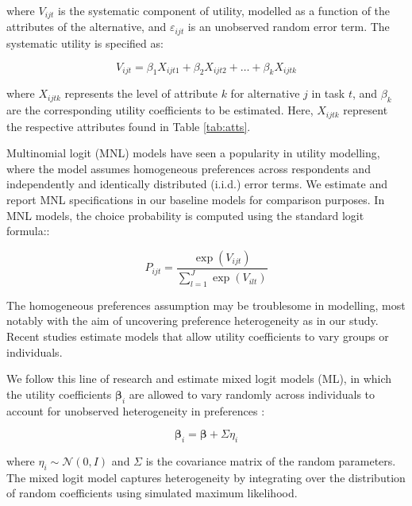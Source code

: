 \documentclass[3p,11pt ]{elsarticle}
\begin{document}
\noindent where \( V_{ijt} \) is the systematic component of utility, modelled as a function of the attributes of the alternative, and \( \varepsilon_{ijt} \) is an unobserved random error term.
The systematic utility is specified as:

\begin{equation}
V_{ijt} = \beta_1 X_{ijt1} + \beta_2 X_{ijt2} + \ldots + \beta_k X_{ijtk}
\end{equation}

\noindent where \( X_{ijtk} \) represents the level of attribute \( k \) for alternative \( j \) in task \( t \), and \( \beta_k \) are the corresponding utility coefficients to be estimated.
Here,
\( X_{ijtk} \) represent the respective attributes found in Table \ref{tab:atts}.

Multinomial logit (MNL) models have seen a popularity in utility modelling,
where the model assumes homogeneous preferences across respondents and independently and identically distributed (i.i.d.) error terms.
We estimate and report MNL specifications in our baseline models for comparison purposes.
In MNL models,
the choice probability is computed using the standard logit formula::

\begin{equation}
P_{ijt} = \frac{\exp(V_{ijt})}{\sum_{l=1}^{J} \exp(V_{ilt})}
\end{equation}

The homogeneous preferences assumption may be troublesome in modelling,
most notably with the aim of uncovering preference heterogeneity as in our study.
Recent studies estimate models that allow utility coefficients to vary groups or individuals\citep{aitkenOlderHomebuyersPrefer2024,zhaoUsingConjointAnalysis2023, caplanMeasuringHeterogeneousPreferences2021}.


We follow this line of research and estimate mixed logit models (ML), in which the utility coefficients \( \boldsymbol{\beta}_i \) are allowed to vary randomly across individuals to account for unobserved heterogeneity in preferences\citep{mcfaddenMixedMNLModels2000}
:

\begin{equation}
\boldsymbol{\beta}_i = \boldsymbol{\beta} + \Sigma \eta_i
\end{equation}

\noindent where \( \eta_i \sim \mathcal{N}(0, I) \) and \( \Sigma \) is the covariance matrix of the random parameters. The mixed logit model captures heterogeneity by integrating over the distribution of random coefficients using simulated maximum likelihood.
\end{document}
